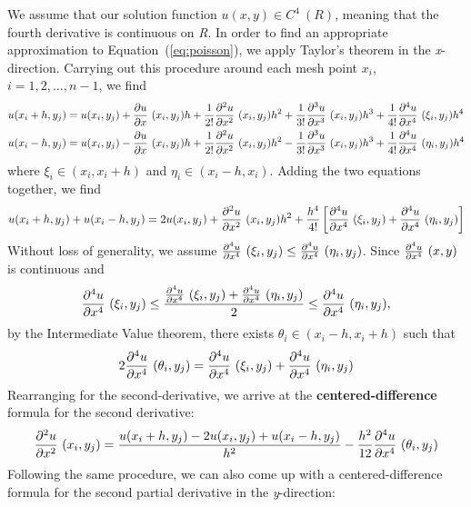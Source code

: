 \documentclass[12pt, titlepage]{article}
\begin{document}
    We assume that our solution function $u(x,y) \in C^4~(R)$, meaning that the fourth derivative is continuous on \textit{R}. In order to find an appropriate approximation to Equation~(\ref{eq:poisson}),
    we apply Taylor's theorem in the \textit{x}-direction. Carrying out this procedure around each mesh point $x_i$,\\
    $i=1,2,\dots,n-1$, we find
    \small
    \begin{align*}
        u(x_i + h, y_j) &= u(x_i, y_j) + \pdv{u}{x}~(x_i,y_j)h+\frac{1}{2!}\pdv[2]{u}{x}~(x_i,y_j)h^2+\frac{1}{3!}\pdv[3]{u}{x}~(x_i,y_j)h^3+\frac{1}{4!}\pdv[4]{u}{x}~(\xi_i,y_j)h^4\\
        u(x_i - h, y_j) &= u(x_i, y_j) - \pdv{u}{x}~(x_i,y_j)h+\frac{1}{2!}\pdv[2]{u}{x}~(x_i,y_j)h^2-\frac{1}{3!}\pdv[3]{u}{x}~(x_i,y_j)h^3+\frac{1}{4!}\pdv[4]{u}{x}~(\eta_i,y_j)h^4
    \end{align*}
    \normalsize
    where $\xi_i \in (x_i, x_i+h)$ and $\eta_i \in (x_i-h,x_i)$. Adding the two equations together, we find
    \small
    \begin{equation*}
        u(x_i + h, y_j) + u(x_i - h, y_j) = 2u(x_i, y_j) + \pdv[2]{u}{x}~(x_i, y_j)h^2 + \frac{h^4}{4!}\left[\pdv[4]{u}{x}~(\xi_i, y_j) + \pdv[4]{u}{x}~(\eta_i, y_j)\right]
    \end{equation*}
    \normalsize
    Without loss of generality, we assume $\pdv[4]{u}{x}~(\xi_i, y_j) \leq \pdv[4]{u}{x}~(\eta_i, y_j)$. Since $\pdv[4]{u}{x}~(x,y)$ is continuous and
    \begin{equation*}
        \pdv[4]{u}{x}~(\xi_i, y_j) \leq \frac{\pdv[4]{u}{x}~(\xi_i, y_j) + \pdv[4]{u}{x}~(\eta_i, y_j)}{2} \leq \pdv[4]{u}{x}~(\eta_i, y_j),
    \end{equation*}
    by the Intermediate Value theorem, there exists $\theta_i \in (x_i - h, x_i + h)$ such that
    \begin{equation*}
        2\pdv[4]{u}{x}~(\theta_i, y_j) = \pdv[4]{u}{x}~(\xi_i, y_j) + \pdv[4]{u}{x}~(\eta_i, y_j)
    \end{equation*}
    Rearranging for the second-derivative, we arrive at the \textbf{centered-difference} formula for the second derivative:
    \begin{equation}\label{eq:x_centered_diff}
        \pdv[2]{u}{x}~(x_i, y_j) = \frac{u(x_i + h, y_j) - 2u(x_i, y_j) + u(x_i - h, y_j)}{h^2} - \frac{h^2}{12}\pdv[4]{u}{x}~(\theta_i, y_j)
    \end{equation}
    Following the same procedure, we can also come up with a centered-difference formula for the second partial derivative in the \textit{y}-direction:
\end{document}
